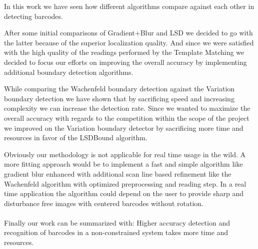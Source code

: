 In this work we have seen how different algorithms compare against each other in detecting barcodes.

After some initial comparisons of Gradient+Blur and LSD we decided to go with the latter because of the superior localization quality. And since we were satisfied with the high quality of the readings performed by the Template Matching we decided to focus our efforts on improving the overall accuracy by implementing additional boundary detection algorithms.

While comparing the Wachenfeld boundary detection against the Variation boundary detection we have shown that by sacrificing speed and increasing complexity we can increase the detection rate. Since we wanted to maximize the overall accuracy with regards to the competition within the scope of the project we improved on the Variation boundary detector by sacrificing more time and resources in favor of the LSDBound algorithm.

Obviously our methodology is not applicable for real time usage in the wild. A more fitting approach would be to implement a fast and simple algorithm like gradient blur enhanced with additional scan line based refinement like the Wachenfeld algorithm with optimized preprocessing and reading step. In a real time application the algorithm could depend on the user to provide sharp and disturbance free images with centered barcodes without rotation. 
\\
\\
Finally our work can be summarized with: Higher accuracy detection and recognition of barcodes in a non-constrained system takes more time and resources.
